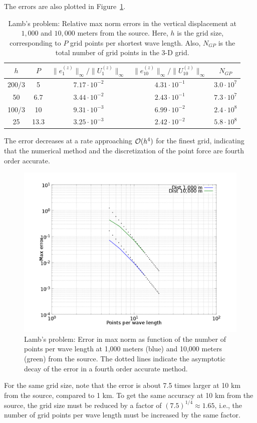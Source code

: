 \documentclass[11pt]{report}
\begin{document}
The errors are also plotted in Figure~\ref{fig:ppw-err}.
\begin{table}
\begin{center}
\begin{tabular}{| c | c | c | c | c |}
\hline
$h$ & $P$  & $\| e_1^{(z)}\|_\infty / \|U_1^{(z)}\|_\infty$  & $\| e_{10}^{(z)}\|_\infty /
\|U_{10}^{(z)}\|_\infty$ & $N_{GP}$ \\ \hline
 200/3 & 5   & $7.17\cdot 10^{-2}$  & $4.31\cdot 10^{-1}$ & $3.0\cdot 10^7$ \\ \hline
 50    & 6.7 & $3.44\cdot 10^{-2}$  & $2.43\cdot 10^{-1}$ & $7.3\cdot 10^7$ \\ \hline
 100/3 & 10  & $9.31\cdot 10^{-3}$  & $6.99\cdot 10^{-2}$ & $2.4\cdot 10^8$ \\ \hline
 25    & 13.3 & $3.25\cdot 10^{-3}$ & $2.42\cdot 10^{-2}$ & $5.8\cdot 10^8$ \\ \hline
\end{tabular}
\caption{Lamb's problem: Relative max norm errors in the vertical displacement at $1,000$ and
  $10,000$ meters from the source. Here, $h$ is the grid size, corresponding to $P$ grid points per
  shortest wave length. Also, $N_{GP}$ is the total number of grid points in the 3-D grid.}
\label{tab:lamb-err}
\end{center}
\end{table}
The error decreases at a rate approaching ${\cal O}(h^4)$ for the finest grid, indicating that the
numerical method and the discretization of the point force are fourth order accurate.
\begin{figure}[htp]
\begin{centering}
  \includegraphics[width=0.8\linewidth]{figures/ppw-err.png}
  \caption{Lamb's problem: Error in max norm as function of the number of points per wave length at
    1,000 meters (blue) and 10,000 meters (green) from the source. The
    dotted lines indicate the asymptotic decay of the error in a fourth order accurate method.}
  \label{fig:ppw-err}
\end{centering}
\end{figure}
For the same grid size, note that the error is about 7.5 times larger at 10 km from the source,
compared to 1 km. To get the same accuracy at 10 km from the source, the grid size must be reduced
by a factor of $(7.5)^{1/4}\approx 1.65$, i.e., the number of grid points per wave length must be
increased by the same factor.
\end{document}
